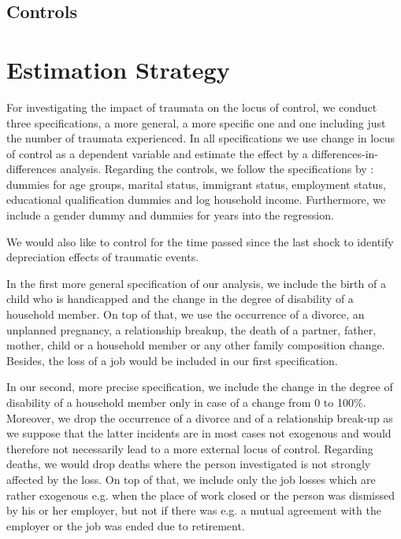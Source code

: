 \documentclass[12pt, a4paper, fleqn, parskip]{scrartcl}
\begin{document}
\subsection{Controls} %
\label{sub:controls}




\section{Estimation Strategy}

For investigating the impact of traumata on the locus of control, we conduct
three specifications, a more general, a more specific one and one including
just the number of traumata experienced. In all specifications we use change in
locus of control as a dependent variable and estimate the effect by a
differences-in-differences analysis. Regarding the controls, we follow the
specifications by \citet{cobb2013}: dummies for age groups, marital
status, immigrant status, employment status, educational qualification dummies
and log household income. Furthermore, we include a gender dummy and dummies
for years into the regression.

We would also like to control for the time passed since the last shock to
identify depreciation effects of traumatic events.

In the first more general specification of our analysis, we include the birth
of a child who is handicapped and the change in the degree of disability of a
household member. On top of that, we use the occurrence of a divorce, an
unplanned pregnancy, a relationship breakup, the death of a partner, father,
mother, child or a household member or any other family composition change.
Besides, the loss of a job would be included in our first specification.

In our second, more precise specification, we include the change in the degree
of disability of a household member only in case of a change from 0 to 100\%.
Moreover, we drop the occurrence of a divorce and of a relationship break-up as
we suppose that the latter incidents are in most cases not exogenous and would
therefore not necessarily lead to a more external locus of control. Regarding
deaths, we would drop deaths where the person investigated is not strongly
affected by the loss. On top of that, we include only the job losses which are
rather exogenous e.g. when the place of work closed or the person was dismissed
by his or her employer, but not if there was e.g. a mutual agreement with the
employer or the job was ended due to retirement.
\end{document}
